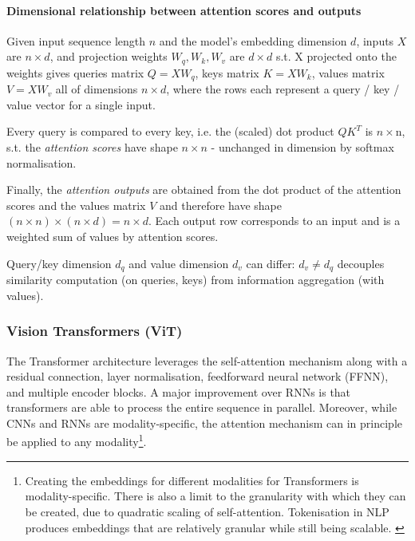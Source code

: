 \paragraph{Dimensional relationship between attention scores and outputs}

Given input sequence length $n$ and the model's embedding dimension $d$, inputs $X$ are $n \times d$, and projection weights $W_q, W_k, W_v$ are $d \times d$
s.t. X projected onto the weights gives queries matrix $Q = X W_q$, keys matrix $K = X W_k$, values matrix $V = X W_v$ all of dimensions $n \times d$,
where the rows each represent a query / key / value vector for a single input.

Every query is compared to every key, i.e. the (scaled) dot product $Q K^T$ is $n \times $n,
s.t. the \textit{attention scores} have shape $n \times n$ - unchanged in dimension by softmax normalisation.

Finally, the \textit{attention outputs} are obtained from the dot product of the attention scores and the values matrix $V$
and therefore have shape $(n \times n) \times (n \times d) = n \times d$.
Each output row corresponds to an input
and is a weighted sum of values by attention scores.

Query/key dimension $d_q$ and value dimension $d_v$ can differ:
$d_v \neq d_q$ decouples similarity computation (on queries, keys) from information aggregation (with values). \citep{prince2023understanding}

\subsubsection{Vision Transformers (ViT)}

The Transformer architecture \citep{vaswani2023attentionneed} leverages the self-attention mechanism along with a residual connection, layer normalisation, feedforward neural network (FFNN), and multiple encoder blocks.
A major improvement over RNNs is that transformers are able to process the entire sequence in parallel.
Moreover, while CNNs and RNNs are modality-specific, the attention mechanism can in principle be applied to any modality\footnote{
    Creating the embeddings for different modalities for Transformers is modality-specific.
    There is also a limit to the granularity with which they can be created, due to quadratic scaling of self-attention.
    Tokenisation in NLP produces embeddings that are relatively granular while still being scalable. \citep{prince2023understanding,ye2022geometry}
}. \citep{prince2023understanding,ye2022geometry}

